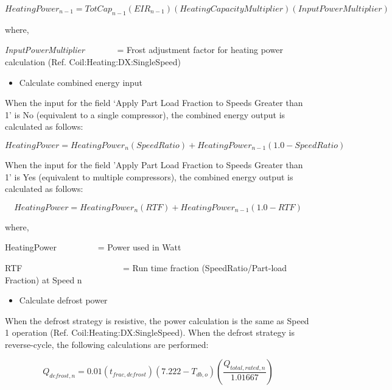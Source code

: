 \begin{equation}
HeatingPowe{r_{n - 1}} = TotCa{p_{n - 1}}\left( {EI{R_{n - 1}}} \right)\left( {HeatingCapacityMultiplier} \right)\left( {InputPowerMultiplier} \right)
\end{equation}

where,

\emph{InputPowerMultiplier}~~~~~~~ = Frost adjustment factor for heating power calculation (Ref. Coil:Heating:DX:SingleSpeed)

\begin{itemize}
  \item Calculate combined energy input
\end{itemize}

When the input for the field `Apply Part Load Fraction to Speeds Greater than 1' is No (equivalent to a single compressor), the combined energy output is calculated as follows:

\begin{equation}
HeatingPower = HeatingPowe{r_n}\left( {SpeedRatio} \right) + HeatingPowe{r_{n - 1}}(1.0 - SpeedRatio)
\end{equation}

When the input for the field 'Apply Part Load Fraction to Speeds Greater than 1' is Yes (equivalent to multiple compressors), the combined energy output is calculated as follows:

\begin{equation}
HeatingPower = HeatingPowe{r_n}\left( {RTF} \right) + HeatingPowe{r_{n - 1}}(1.0 - RTF)
\end{equation}

where,

HeatingPower~~~~~~~~~ = Power used in Watt

RTF~~~~~~~~~~~~~~~~~~~~~~~ = Run time fraction (SpeedRatio/Part-load Fraction) at Speed n

\begin{itemize}
  \item Calculate defrost power
\end{itemize}

When the defrost strategy is resistive, the power calculation is the same as Speed 1 operation (Ref. Coil:Heating:DX:SingleSpeed). When the defrost strategy is reverse-cycle, the following calculations are performed:

\begin{equation}
{Q_{defrost,n}} = 0.01({t_{frac,defrost}})(7.222 - {T_{db,o}})\left( {\frac{{{Q_{total,rated,n}}}}{{1.01667}}} \right)
\end{equation}

